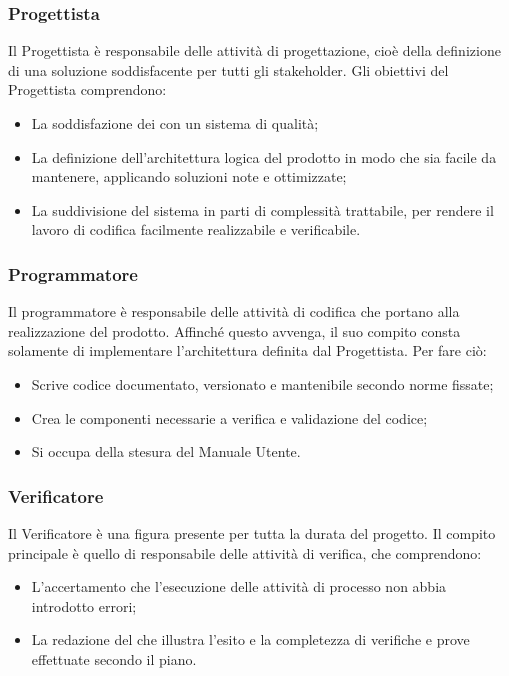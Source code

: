 \documentclass[NormeDiProgetto.tex]{subfiles}
\begin{document}
	\subsubsection{Progettista}
	Il Progettista è responsabile delle attività di progettazione, cioè della definizione di una soluzione soddisfacente per tutti gli stakeholder. Gli obiettivi del Progettista comprendono:
	\begin{itemize}
		\item La soddisfazione dei  con un sistema di qualità;
		\item La definizione dell'architettura logica del prodotto in modo che sia facile da mantenere, applicando soluzioni note e ottimizzate;
		\item La suddivisione del sistema in parti di complessità trattabile, per rendere il lavoro di codifica facilmente realizzabile e verificabile.
	\end{itemize} 

	\subsubsection{Programmatore}
	Il programmatore è responsabile delle attività di codifica che portano alla realizzazione del prodotto. Affinché questo avvenga, il suo compito consta solamente di implementare l'architettura definita dal Progettista. Per fare ciò:
	\begin{itemize}
		\item Scrive codice documentato, versionato e mantenibile secondo norme fissate;
		\item Crea le componenti necessarie a verifica e validazione del codice;
		\item Si occupa della stesura del Manuale Utente.
	\end{itemize}

	\subsubsection{Verificatore}
	Il Verificatore è una figura presente per tutta la durata del progetto. Il compito principale è quello di responsabile delle attività di verifica, che comprendono:
	\begin{itemize}
	\item L'accertamento che l'esecuzione delle attività di processo non abbia introdotto errori;
	\item La redazione del \pdq{} che illustra l'esito e la completezza di verifiche e prove effettuate secondo il piano.
	\end{itemize}
	
\end{document}
